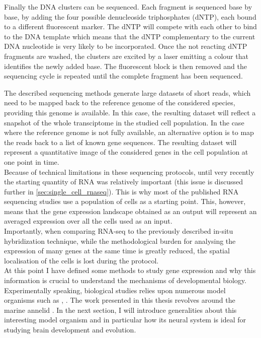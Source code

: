 \begin{itemize}
	 Finally the DNA clusters can be sequenced. Each fragment is sequenced base by base, by adding the four possible denucleoside triphosphates (dNTP), each bound to a different fluorescent marker. The dNTP will compete with each other to bind to the DNA template which means that the dNTP complementary to the current DNA nucleotide is very likely to be incorporated. Once the not reacting dNTP fragments are washed, the clusters are excited by a laser emitting a colour that identifies the newly added base. The fluorescent block is then removed and the sequencing cycle is repeated until the complete fragment has been sequenced.
    
\end{itemize}     
    
    The described sequencing methods generate large datasets of short reads, which need to be mapped back to the reference genome of the considered species, providing this genome is available. In this case, the resulting dataset will reflect a snapshot of the whole transciptome in the studied cell population. In the case where the reference genome is not fully available, an alternative option is to map the reads back to a list of known gene sequences. The resulting dataset will represent a quantitative image of the considered genes in the cell population at one point in time.\\
    
    Because of technical limitations in these sequencing protocols, until very recently the starting quantity of RNA was relatively important (this issue is discussed further in \ref{sec:single_cell_rnaseq}). This is why most of the published RNA sequencing studies use a population of cells as a starting point. This, however, means that the gene expression landscape obtained as an output will represent an averaged expression over all the cells used as an input.\\
    
    Importantly, when comparing RNA-seq to the previously described in-situ hybridization technique, while the methodological burden for analysing the expression of many genes at the same time is greatly reduced, the spatial localisation of the cells is lost during the protocol.\\
    
    At this point I have defined some methods to study gene expression and why this information is crucial to understand the mechanisms of developmental biology. Experimentally speaking, biological studies relies upon numerous model organisms such as , . The work presented in this thesis revolves around the marine annelid \platyfull{}. In the next section, I will introduce generalities about this interesting model organism and in particular how its neural system is ideal for studying brain development and evolution.
    
